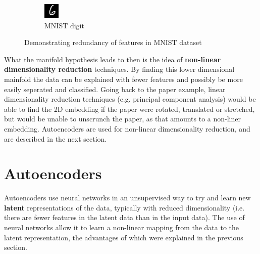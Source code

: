 \documentclass[12pt,a4paper,twoside,openright]{report}
\begin{document}
\begin{figure}[H]
\begin{subfigure}[b]{0.4\linewidth}
    \includegraphics[width=\linewidth,scale=1]{figs/digit.png}
    \caption{MNIST digit}
  \end{subfigure}
  \caption{Demonstrating redundancy of features in MNIST dataset}
  \label{fig:digit}
\end{figure}

What the manifold hypothesis leads to then is the idea of \textbf{non-linear dimensionality reduction} techniques. By finding this lower dimensional
mainfold the data can be explained with fewer features and possibly be more easily seperated and classified. Going back to the paper example,
linear dimensionality reduction techniques (e.g. principal component analysis) would be able to find the 2D embedding if the paper were 
rotated, translated or stretched, but would be unable to unscrunch the paper, as that amounts to a non-liner embedding. Autoencoders are 
used for non-linear dimensionality reduction, and are described in the next section.

\section{Autoencoders}

Autoencoders use neural networks in an unsupervised way to try and learn new \textbf{latent} representations of the data, typically with reduced 
dimensionality (i.e. there are fewer features in the latent data than in the input data). The use of neural networks allow it to learn a 
non-linear mapping from the data to the latent representation, the advantages of which were explained in the previous section.
\end{document}

